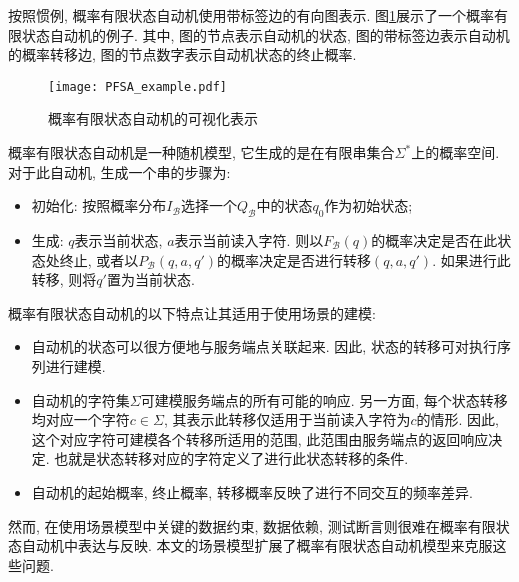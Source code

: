             按照惯例, 概率有限状态自动机使用带标签边的有向图表示. 图\ref{fig:PFSA_example}展示了一个概率有限状态自动机的例子. 其中, 图的节点表示自动机的状态, 图的带标签边表示自动机的概率转移边, 图的节点数字表示自动机状态的终止概率.
            
            \begin{figure}
                \centering
                \texttt{[image: PFSA\_example.pdf]}
                \caption{概率有限状态自动机的可视化表示}
                \label{fig:PFSA_example}
            \end{figure}
            
            概率有限状态自动机是一种随机模型, 它生成的是在有限串集合$\Sigma^{*}$上的概率空间. 对于此自动机, 生成一个串的步骤为:
            
            \begin{itemize}
                \item 初始化: 按照概率分布$I_\mathcal{B}$选择一个$Q_{\mathcal{B}}$中的状态$q_0$作为初始状态;
                
                \item 生成: $q$表示当前状态, $a$表示当前读入字符. 则以$F_{\mathcal{B}}(q)$的概率决定是否在此状态处终止, 或者以$P_{\mathcal{B}}(q, a, q')$的概率决定是否进行转移$(q,a,q')$. 如果进行此转移, 则将$q'$置为当前状态.
            \end{itemize}
        
            概率有限状态自动机的以下特点让其适用于使用场景的建模:
            
            \begin{itemize}
                \item 自动机的状态可以很方便地与服务端点关联起来. 因此, 状态的转移可对执行序列进行建模.
                
                \item 自动机的字符集$\Sigma$可建模服务端点的所有可能的响应. 另一方面, 每个状态转移均对应一个字符$c \in \Sigma$, 其表示此转移仅适用于当前读入字符为$c$的情形. 因此, 这个对应字符可建模各个转移所适用的范围, 此范围由服务端点的返回响应决定. 也就是状态转移对应的字符定义了进行此状态转移的条件.
                
                \item 自动机的起始概率, 终止概率, 转移概率反映了进行不同交互的频率差异.
            \end{itemize}
            
            然而, 在使用场景模型中关键的数据约束, 数据依赖, 测试断言则很难在概率有限状态自动机中表达与反映. 本文的场景模型扩展了概率有限状态自动机模型来克服这些问题.
        
